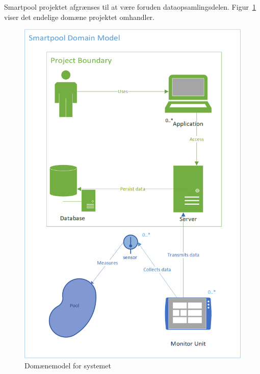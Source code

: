 Smartpool projektet afgrænses til at være foruden dataopsamlingsdelen. Figur~\ref{fig:domainmodelboundary} viser det endelige domæne projektet omhandler.

\begin{figure}
	\centering
	\includegraphics[width=0.7\linewidth]{figs/ProjectBoundary}
	\caption{Domænemodel for systemet}
	\label{fig:domainmodelboundary}
\end{figure}